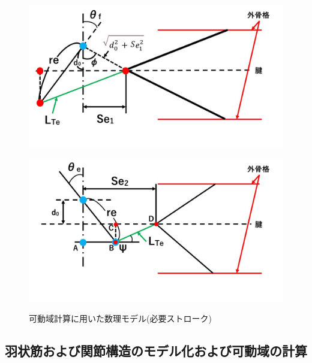 \begin{figure}[t]
  \begin{minipage}[b]{0.49\hsize}
    \centering  
    \includegraphics[scale=0.23]{image/model_1.jpg}
    \label{fig:model_1_before}
  \end{minipage}
  \begin{minipage}[b]{0.49\hsize}
    \centering
    \includegraphics[scale=0.23]{image/model_2.jpg}
    \label{fig:model_1_after}
  \end{minipage}
  \caption{可動域計算に用いた数理モデル(必要ストローク)}
  \label{fig:model_1}
\end{figure}
\subsection{羽状筋および関節構造のモデル化および可動域の計算}
